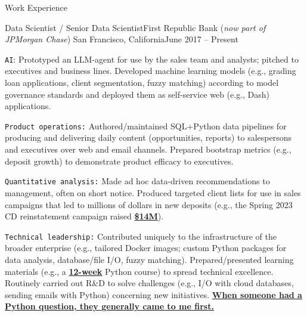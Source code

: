 \documentclass{article}
\newlength{\tabin}
\newlength{\secsep}
\newcommand{\lineunder}{\vspace*{-8pt} \\ \hspace*{-6pt} \hrulefill \\ \vspace*{-15pt}}
\newenvironment{tabbedsection}[1]{
  \begin{list}{}{
      \setlength{\itemsep}{0pt}
      \setlength{\labelsep}{0pt}
      \setlength{\labelwidth}{0pt}
      \setlength{\leftmargin}{\tabin}
      \setlength{\rightmargin}{\tabin}
      \setlength{\listparindent}{0pt}
      \setlength{\parsep}{0pt}
      \setlength{\parskip}{0pt}
      \setlength{\partopsep}{0pt}
      \setlength{\topsep}{#1}
    }
  \item[]
}{\end{list}}
\newenvironment{resume_section}[1]{
  \filbreak
  \vspace{2\secsep}
  \textsc{\large#1}
  \lineunder
  \begin{tabbedsection}{\secsep}
}{\end{tabbedsection}}
\newenvironment{subitems}{
  \renewcommand{\labelitemi}{-}
  \begin{itemize}
      \setlength{\labelsep}{1em}
}{\end{itemize}}
\newenvironment{resume_employer}[4]{
  \vspace{\secsep}
  \textbf{#1} \\ 
  \indent {\small #2} \hfill {\footnotesize#3 (#4)}
  \begin{tabbedsection}{0pt}
  \begin{subitems}
}{\end{subitems}\end{tabbedsection}}
\begin{document}
\begin{resume_section}{Work Experience}

  \begin{resume_employer}{Data Scientist / Senior Data Scientist}{First Republic Bank (\textit{now part of JPMorgan Chase})}
  {San Francisco, California}{June 2017 -- Present}

    \item \texttt{AI}: Prototyped an LLM-agent for use by the sales team and analysts; pitched to executives and business lines. Developed machine learning models (e.g., grading loan applications, client segmentation, fuzzy matching) according to model governance standards and deployed them as self-service web (e.g., Dash) applications.
    \item \texttt{Product operations:} Authored/maintained SQL+Python data pipelines for producing and delivering daily content (opportunities, reports) to salespersons and executives over web and email channels. Prepared bootstrap metrics (e.g., deposit growth) to demonstrate product efficacy to executives.
    \item \texttt{Quantitative analysis:} Made ad hoc data-driven recommendations to management, often on short notice. Produced targeted client lists for use in sales campaigns that led to millions of dollars in new deposits (e.g., the Spring 2023 CD reinstatement campaign raised \underline{\textbf{\$14M}}).
    \item \texttt{Technical leadership:} Contributed uniquely to the infrastructure of the broader enterprise (e.g., tailored Docker images; custom Python packages for data analysis, database/file I/O, fuzzy matching). Prepared/presented learning materials (e.g., a \underline{\textbf{12-week}} Python course) to spread technical excellence. Routinely carried out R\&D to solve challenges (e.g., I/O with cloud databases, sending emails with Python) concerning new initiatives. \underline{\textbf{When someone had a Python question, they generally came to me first.}}
  \end{resume_employer}


\end{resume_section}
\end{document}

